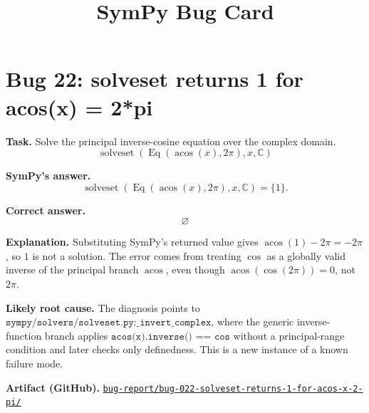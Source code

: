 \documentclass[11pt]{article}
\title{SymPy Bug Card}
\author{}
\date{}
\newcommand{\artifactrepo}{https://github.com/TODO-org/TODO-repo}
\newcommand{\bugbundle}[1]{\href{\artifactrepo/tree/main/bug-report/#1}{\nolinkurl{bug-report/#1/}}}
\begin{document}
\maketitle

\section*{Bug 22: solveset returns 1 for acos(x) = 2*pi}

\begin{counterexamplebox}
\textbf{Task.} Solve the principal inverse-cosine equation over the complex domain.
\[
  \operatorname{solveset}(\operatorname{Eq}(\operatorname{acos}(x), 2\pi), x, \mathbb{C})
\]

\medskip
\textbf{SymPy's answer.}
\[
  \operatorname{solveset}(\operatorname{Eq}(\operatorname{acos}(x), 2\pi), x, \mathbb{C}) = \{1\}.
\]

\medskip
\textbf{Correct answer.}
\[
  \varnothing
\]

\medskip
\textbf{Explanation.} Substituting SymPy's returned value gives
\(\operatorname{acos}(1) - 2\pi = -2\pi\), so \(1\) is not a solution.  The error comes from
treating \(\cos\) as a globally valid inverse of the principal branch
\(\operatorname{acos}\), even though \(\operatorname{acos}(\cos(2\pi)) = 0\), not \(2\pi\).

\medskip
\textbf{Likely root cause.} The diagnosis points to
\(\texttt{sympy/solvers/solveset.py:\_invert\_complex}\), where the generic
inverse-function branch applies \(\texttt{acos(x).inverse() == cos}\) without a
principal-range condition and later checks only definedness.  This is a new
instance of a known failure mode.

\medskip
\textbf{Artifact (GitHub).} \bugbundle{bug-022-solveset-returns-1-for-acos-x-2-pi}
\end{counterexamplebox}
\end{document}
